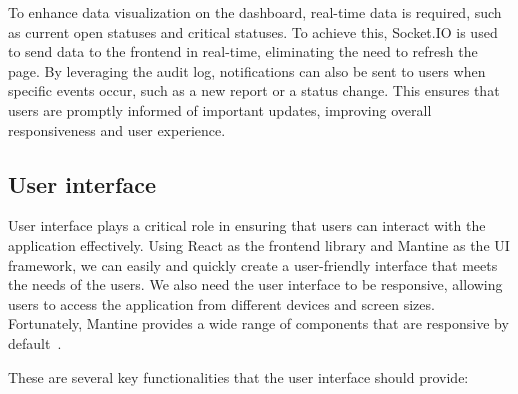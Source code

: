 To enhance data visualization on the dashboard, real-time data is required, such as current open statuses and critical statuses. To achieve this, Socket.IO is used to send data to the frontend in real-time, eliminating the need to refresh the page. By leveraging the audit log, notifications can also be sent to users when specific events occur, such as a new report or a status change. This ensures that users are promptly informed of important updates, improving overall responsiveness and user experience.

\subsection{User interface}
\label{subsec:internship_experience:user_interface}

User interface plays a critical role in ensuring that users can interact with the application effectively. Using React as the frontend library and Mantine as the UI framework, we can easily and quickly create a user-friendly interface that meets the needs of the users. We also need the user interface to be responsive, allowing users to access the application from different devices and screen sizes. Fortunately, Mantine provides a wide range of components that are responsive by default~\cite{noauthor_mantine_nodate}.

These are several key functionalities that the user interface should provide:

